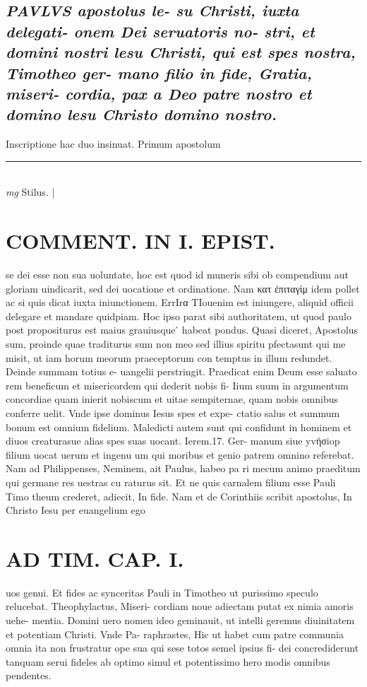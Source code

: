\documentclass{article}
\begin{document}
\begin{pages}
\subsection*{\textit{\huge\textbf{P}\normalsize AVLVS apostolus le- su Christi, iuxta delegati- onem Dei seruatoris no- stri, et domini nostri lesu Christi, qui est spes nostra, Timotheo ger- mano filio in fide, Gratia, miseri- cordia, pax a Deo patre nostro et domino lesu Christo domino nostro. }}\pstart Inscriptione hac duo insinuat. Primum apostolum  \pend
\vspace{0.5cm}\noindent
\vspace{0.2cm}\rule{1cm}{0.2pt}\\ 
\hspace{0.2cm}\textit{mg}
\footnotesize Stilus. 
\normalsize| 
\section*{COMMENT. IN I. EPIST. }\pstart se dei esse non sua uoluntate, hoc est quod id muneris sibi ob compendium aut gloriam uindicarit, sed dei uocatione et ordinatione. Nam κατ ἐπιταγίμ idem pollet ac si quis dicat iuxta iniunctionem. ErrIrα TIouenim est iniungere, aliquid officii delegare et mandare quidpiam. Hoc ipso parat sibi authoritatem, ut quod paulo post propositurus est maius grauiusque ́ habeat pondus. Quasi diceret, Apostolus sum, proinde quae traditurus sum non meo sed illius spiritu pfectasunt qui me misit, ut iam horum meorum praeceptorum con temptus in illum redundet. Deinde summam totius e- uangelii perstringit. Praedicat enim Deum esse saluato rem beneficum et misericordem qui dederit nobis fi- Iium suum in argumentum concordiae quam inierit nobiscum et uitae sempiternae, quam nobis omnibus conferre uelit. Vnde ipse dominus Iesus spes et expe- ctatio salus et summum bonum est omnium fidelium. Maledicti autem sunt qui confidunt in hominem et diuos creaturasue alias spes suas uocant. Ierem.17. Ger- manum siue yvήσiop filium uocat uerum et ingenu um qui moribus et genio patrem omnino referebat. Nam ad Philippenses, Neminem, ait Paulus, habeo pa ri mecum animo praeditum qui germane res uestras cu raturus sit. Et ne quis carnalem filium esse Pauli Timo theum crederet, adiecit, In fide. Nam et de Corinthiis scribit apostolus, In Christo Iesu per euangelium ego  \pend
\section*{AD TIM. CAP. I. }
\marginpar{[ p.95 ]}\pstart uos genui. Et fides ac synceritas Pauli in Timotheo ut purissimo speculo relucebat. Theophylactus, Miseri- cordiam noue adiectam putat ex nimia amoris uehe- mentia. Domini uero nomen ideo geminauit, ut intelli geremus diuinitatem et potentiam Christi. Vnde Pa- raphrastes, Hic ut habet cum patre communia omnia ita non frustratur ope sua qui sese totos semel ipsius fi- dei concrediderunt tanquam serui fideles ab optimo simul et potentissimo hero modis omnibus pendentes.  \pend
{}
{}

\end{pages}
\end{document}
